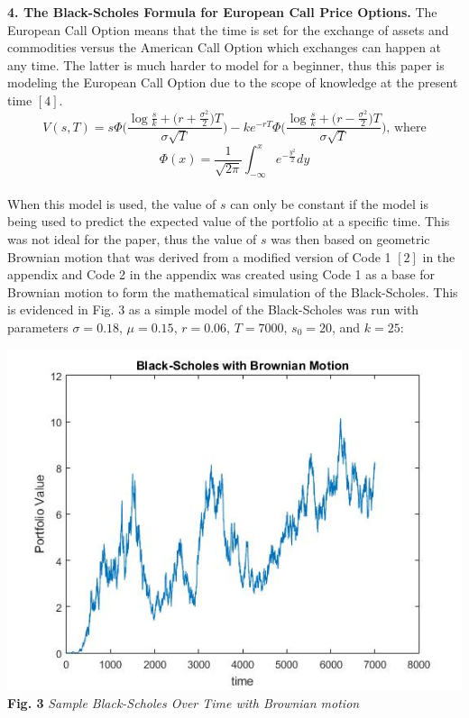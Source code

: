 \documentclass{report}
\begin{document}
	\textbf{4. The Black-Scholes Formula for European Call Price Options.} The European Call Option means that the time is set for the exchange of assets and commodities versus the American Call Option which exchanges can happen at any time. The latter is much harder to model for a beginner, thus this paper is modeling the European Call Option due to the scope of knowledge at the present time $[4]$. \\
	
	\[V(s,T) = s\Phi\Bigg(\frac{\log\frac{s}{k}+\big(r + \frac{\sigma^2}{2}\big)T}{\sigma\sqrt{T}}\Bigg) - ke^{-rT}\Phi\Bigg(\frac{\log\frac{s}{k}+\big(r - \frac{\sigma^2}{2}\big)T}{\sigma\sqrt{T}}\Bigg) \text{, where}\]
	\[ \Phi(x) = \frac{1}{\sqrt{2\pi}} \int_{-\infty}^{x} e^{-\frac{y^2}{2}}dy\]
	\\
	
	When this model is used, the value of $s$ can only be constant if the model is being used to predict the expected value of the portfolio at a specific time. This was not ideal for the paper, thus the value of $s$ was then based on geometric Brownian motion that was derived from a modified version of Code 1 $[2]$ in the appendix and Code 2 in the appendix was created using Code 1 as a base for Brownian motion to form the mathematical simulation of the Black-Scholes. This is evidenced in Fig. 3 as a simple model of the Black-Scholes was run with parameters $\sigma =0.18$, $\mu = 0.15$, $r=0.06$, $T = 7000$, $s_0 = 20$, and $k = 25$:
	\begin{center}
		\includegraphics[scale=0.4]{example2}
		\\ \small\textbf{Fig. 3}  \textit{Sample Black-Scholes Over Time with Brownian motion}
	\end{center} \normalsize
	
\end{document}
